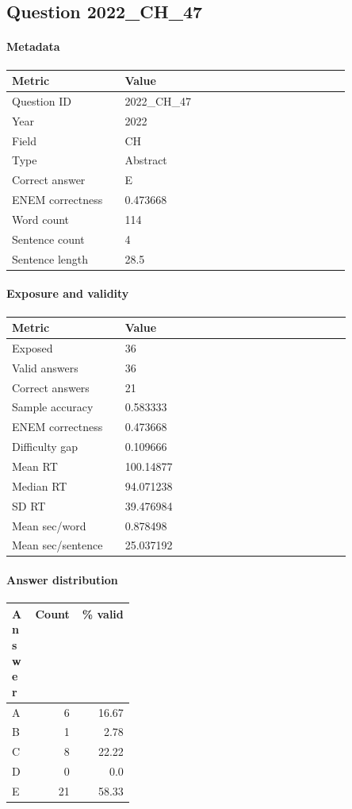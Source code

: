 \subsection*{Question 2022\_CH\_47}
\label{sec:q_2022_CH_47}
\paragraph{Metadata}
\begin{tabular}{p{0.30\linewidth}p{0.60\linewidth}}
\toprule
Metric & Value\\
\midrule
Question ID & 2022\_CH\_47\\
Year & 2022\\
Field & CH\\
Type & Abstract\\
Correct answer & E\\
ENEM correctness & 0.473668\\
Word count & 114\\
Sentence count & 4\\
Sentence length & 28.5\\
\bottomrule
\end{tabular}

\paragraph{Exposure and validity}
\begin{tabular}{p{0.30\linewidth}p{0.60\linewidth}}
\toprule
Metric & Value\\
\midrule
Exposed & 36\\
Valid answers & 36\\
Correct answers & 21\\
Sample accuracy & 0.583333\\
ENEM correctness & 0.473668\\
Difficulty gap & 0.109666\\
Mean RT & 100.14877\\
Median RT & 94.071238\\
SD RT & 39.476984\\
Mean sec/word & 0.878498\\
Mean sec/sentence & 25.037192\\
\bottomrule
\end{tabular}

\paragraph{Answer distribution}
\begin{tabular}{p{0.18\linewidth}rr}
\toprule
Answer & Count & \% valid\\
\midrule
A & 6 & 16.67\\
B & 1 & 2.78\\
C & 8 & 22.22\\
D & 0 & 0.0\\
E & 21 & 58.33\\
\bottomrule
\end{tabular}

